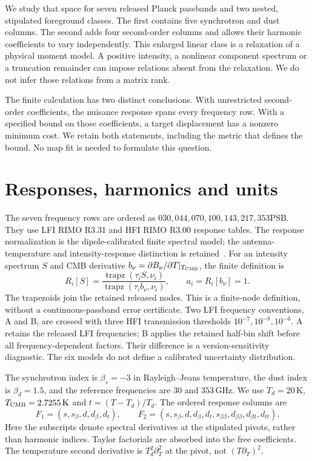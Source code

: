 \documentclass[aps,prd,onecolumn,11pt,nofootinbib,notitlepage]{revtex4-2}
\begin{document}
We study that space for seven released Planck passbands and two nested, stipulated foreground classes. The first contains five synchrotron and dust columns. The second adds four second-order columns and allows their harmonic coefficients to vary independently. This enlarged linear class is a relaxation of a physical moment model. A positive intensity, a nonlinear component spectrum or a truncation remainder can impose relations absent from the relaxation. We do not infer those relations from a matrix rank.

The finite calculation has two distinct conclusions. With unrestricted second-order coefficients, the nuisance response spans every frequency row. With a specified bound on those coefficients, a target displacement has a nonzero minimum cost. We retain both statements, including the metric that defines the bound. No map fit is needed to formulate this question.

\section{Responses, harmonics and units}

The seven frequency rows are ordered as $030,044,070,100,143,217,353\mathrm{PSB}$. They use LFI RIMO R3.31 and HFI RIMO R3.00 response tables. The response normalization is the dipole-calibrated finite spectral model; the antenna-temperature and intensity-response distinction is retained~\cite{PlanckLFI2013}. For an intensity spectrum $S$ and CMB derivative $b_\nu=\partial B_\nu/\partial T|_{T_{\rm CMB}}$, the finite definition is
\begin{equation}
 R_i[S]=\frac{\operatorname{trapz}(\tau_i S,\nu_i)}{\operatorname{trapz}(\tau_i b_\nu,\nu_i)},\qquad
 a_i=R_i[b_\nu]=1.
 \label{eq:response}
\end{equation}
The trapezoids join the retained released nodes. This is a finite-node definition, without a continuous-passband error certificate. Two LFI frequency conventions, A and B, are crossed with three HFI transmission thresholds $10^{-7},10^{-8},10^{-6}$. A retains the released LFI frequencies; B applies the retained half-bin shift before all frequency-dependent factors. Their difference is a version-sensitivity diagnostic. The six models do not define a calibrated uncertainty distribution.

The synchrotron index is $\beta_s=-3$ in Rayleigh--Jeans temperature, the dust index is $\beta_d=1.5$, and the reference frequencies are $30$ and $353\,\mathrm{GHz}$. We use $T_d=20\,\mathrm K$, $T_{\rm CMB}=2.7255\,\mathrm K$ and $t=(T-T_d)/T_d$. The ordered response columns are
\begin{equation}
 F_1=(s,s_\beta,d,d_\beta,d_t),\qquad
 F_2=(s,s_\beta,d,d_\beta,d_t,s_{\beta\beta},d_{\beta\beta},d_{\beta t},d_{tt}).
 \label{eq:columns}
\end{equation}
Here the subscripts denote spectral derivatives at the stipulated pivots, rather than harmonic indices. Taylor factorials are absorbed into the free coefficients. The temperature second derivative is $T_d^2\partial_T^2$ at the pivot, not $(T\partial_T)^2$.
\end{document}
